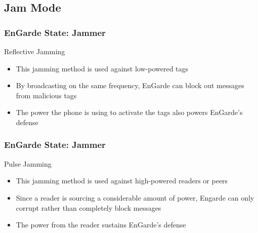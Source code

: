 \documentclass[unknownkeysallowed]{beamer}
\begin{document}
\subsection{Jam Mode}
\begin{frame}
\frametitle{EnGarde State: Jammer}
  \begin{center}
  \begin{minipage}{.9\textwidth}
  \begin{block}{Reflective Jamming}
    \begin{itemize}
      \item{This jamming method is used against low-powered tags}
      \pause
      \vspace{1mm}
      \item{By broadcasting on the same frequency, EnGarde can block out messages from malicious tags}
      \pause
      \vspace{1mm}
      \item{The power the phone is using to activate the tags also powers EnGarde's defense}
    \end{itemize}
  \end{block}
  \end{minipage}
  \end{center}
\end{frame}

\begin{frame}
\frametitle{EnGarde State: Jammer}
  \begin{center}
  \begin{minipage}{.9\textwidth}
  \begin{block}{Pulse Jamming}
    \begin{itemize}
      \item{This jamming method is used against high-powered readers or peers}
      \pause
      \vspace{1mm}
      \item{Since a reader is sourcing a considerable amount of power, Engarde can only corrupt rather than completely block messages}
      \pause
      \vspace{1mm}
      \item{The power from the reader sustains EnGarde's defense}
    \end{itemize}
  \end{block}
  \end{minipage}
  \end{center}
\end{frame}
\end{document}
